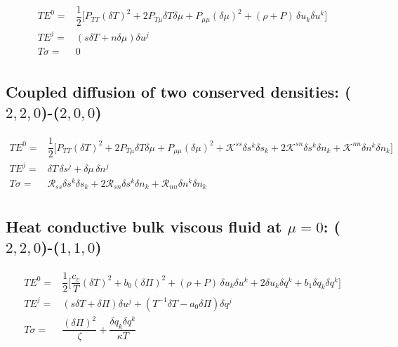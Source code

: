 \documentclass[aps,prl,singlecolumn,nofootinbib]{revtex4-2}
\theoremstyle{definition}
\theoremstyle{theorem}
\begin{document}
\begin{equation}
\begin{split}
TE^0 ={}& \dfrac{1}{2} \bigg[ P_{TT} (\delta T)^2 +2 P_{T\mu} \delta T \delta \mu + P_{\mu \mu} (\delta \mu)^2 + (\rho {+} P)\, \delta u_{k} \delta  u^k \bigg] \\
TE^j ={}&  (s \delta T +n \delta \mu) \delta u^j \\
T\sigma ={}& 0 \\
\end{split}
\end{equation}


\subsection*{Coupled diffusion of two conserved densities: ($2,2,0$)-($2, 0,0$)}

\begin{equation}
\begin{split}
TE^0 ={}& \dfrac{1}{2} \bigg[ P_{TT} (\delta T)^2 +2 P_{T\mu} \delta T \delta \mu + P_{\mu \mu} (\delta \mu)^2 + \mathcal{K}^{ss} \delta s^k \delta s_{k} + 2\mathcal{K}^{sn} \delta s^k \delta n_{k} + \mathcal{K}^{nn} \delta n^k \delta n_{k} \bigg] \\
TE^j ={}&  \delta T \, \delta s^j + \delta \mu \, \delta n^j  \\
T\sigma ={}& \mathcal{R}_{ss} \delta s^k \delta s_{k} + 2\mathcal{R}_{sn} \delta s^k \delta n_{k} + \mathcal{R}_{nn} \delta n^k \delta n_{k} \\
\end{split}
\end{equation}


\subsection*{Heat conductive bulk viscous fluid at $\mu=0$: ($2,2,0$)-($1, 1,0$)}

\begin{equation}
\begin{split}
TE^0 ={}& \dfrac{1}{2} \bigg[ \dfrac{c_v}{T} (\delta T)^2 + b_0 (\delta \Pi)^2 + (\rho {+} P)\, \delta u_{k} \delta  u^k + 2\delta u_k \delta q^k + b_1 \delta q_k \delta q^k \bigg]  \\
TE^j ={}&  (s \delta T +\delta \Pi) \delta u^j + (T^{-1}\delta T -a_0 \delta \Pi) \delta q^j \\
T\sigma ={}& \dfrac{(\delta \Pi)^2}{\zeta} + \dfrac{\delta q_k \delta q^k}{\kappa T} \\
\end{split}
\end{equation}
\end{document}
